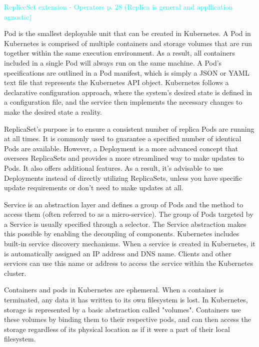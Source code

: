 \label{chap:kubeConcepts}
\textcolor{cyan}{RepliceSet extension - Operators p. 28 (Replica is general and appllication agnostic) }

Pod is the smallest deployable unit that can be created in Kubernetes. \cite{docuKubePods} A Pod in Kubernetes is comprised of multiple containers and storage volumes that are run together within the same execution environment. As a result, all containers included in a single Pod will always run on the same machine. \cite{kubeUpAndRunningPods}
A Pod's specifications are outlined in a Pod manifest, which is simply a JSON or YAML text file that represents the Kubernetes API object. Kubernetes follows a declarative configuration approach, where the system's desired state is defined in a configuration file, and the service then implements the necessary changes to make the desired state a reality. \cite{docuKubeStaticPod}

ReplicaSet’s purpose is to ensure a consistent number of replica Pods are running at all times. It is commonly used to guarantee a specified number of identical Pods are available. However, a Deployment is a more advanced concept that oversees ReplicaSets and provides a more streamlined way to make updates to Pods. It also offers additional features. As a result, it's advisable to use Deployments instead of directly utilizing ReplicaSets, unless you have specific update requirements or don't need to make updates at all. \cite{docuKubeReplicaset}

Service is an abstraction layer and defines a group of Pods and the method to access them (often referred to as a micro-service). The group of Pods targeted by a Service is usually specified through a selector. The Service abstraction makes this possible by enabling the decoupling of components. \cite{docuKubeSevice} Kubernetes includes built-in service discovery mechanisms. When a service is created in Kubernetes, it is automatically assigned an IP address and DNS name. Clients and other services can use this name or address to access the service within the Kubernetes cluster. \cite{docuKubeSevice}

Containers and pods in Kubernetes are ephemeral. When a container is terminated, any data it has written to its own filesystem is lost. In Kubernetes, storage is represented by a basic abstraction called "volumes". Containers use these volumes by binding them to their respective pods, and can then access the storage regardless of its physical location as if it were a part of their local filesystem. \cite{masteringKubernetesStorage}

